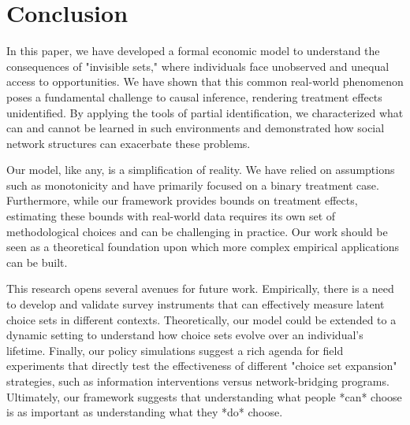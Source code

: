 \section{Conclusion}\label{sec:conclusion}

In this paper, we have developed a formal economic model to understand the consequences of "invisible sets," where individuals face unobserved and unequal access to opportunities. We have shown that this common real-world phenomenon poses a fundamental challenge to causal inference, rendering treatment effects unidentified. By applying the tools of partial identification, we characterized what can and cannot be learned in such environments and demonstrated how social network structures can exacerbate these problems.

Our model, like any, is a simplification of reality. We have relied on assumptions such as monotonicity and have primarily focused on a binary treatment case. Furthermore, while our framework provides bounds on treatment effects, estimating these bounds with real-world data requires its own set of methodological choices and can be challenging in practice. Our work should be seen as a theoretical foundation upon which more complex empirical applications can be built.

This research opens several avenues for future work. Empirically, there is a need to develop and validate survey instruments that can effectively measure latent choice sets in different contexts. Theoretically, our model could be extended to a dynamic setting to understand how choice sets evolve over an individual's lifetime. Finally, our policy simulations suggest a rich agenda for field experiments that directly test the effectiveness of different "choice set expansion" strategies, such as information interventions versus network-bridging programs. Ultimately, our framework suggests that understanding what people *can* choose is as important as understanding what they *do* choose.